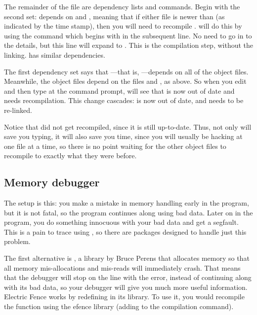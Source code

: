 The remainder of the file are dependency lists and commands. Begin
with the second set:  depends on  and , meaning that if either file is newer than 
(as indicated by the time stamp), then you will need to recompile .  will do this by using the command which begins with
 in the subsequent line. No need to go in to the details, but
this line will expand to . This
is the compilation step, without the linking.  has similar
dependencies.

The first dependency set says that ---that is, ---depends on all of the object files. Meanwhile, the object files
depend on the  files and , as above. So when
you edit  and then type  at the command prompt,
 will see that  is now out of date and needs
recompilation. This change cascades:  is now out of date,
and needs to be re-linked.

Notice that  did not get recompiled, since it is still
up-to-date. Thus, not only will  save you typing, it will also
save you time, since you will usually be hacking at one file at a time,
so there is no point waiting for the other object files to recompile
to exactly what they were before. 

\subsection{Memory debugger}  

The setup is this: you make a mistake in memory handling early in the
program, but it is not fatal, so the program continues along using bad
data. Later on in the program, you do something innocuous with your bad
data and get a segfault. This is a pain to trace using , so
there are packages designed to handle just this problem.

The first alternative is , a
library by Bruce Perens that allocates memory so that all memory
mis-allocations and mis-reads will immediately crash.  That means that
the debugger will stop on the line with the error, instead of continuing
along with its bad data, so your debugger will give you much more useful
information.  Electric Fence works by redefining  in 
its library. To use it, you would recompile the function
using the efence library (adding  to the compilation
command).


